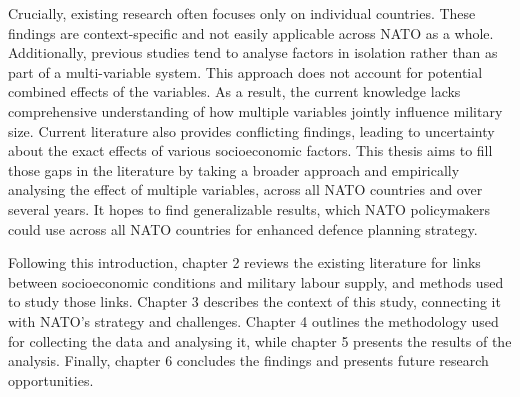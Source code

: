 Crucially, existing research 
often focuses only on individual countries. These findings are context-specific and not easily 
applicable across NATO as a whole. Additionally, previous studies tend to analyse factors in isolation 
rather than as part of a multi-variable system. This approach does not account for potential combined 
effects of the variables. As a result, the current knowledge lacks comprehensive understanding of 
how multiple variables jointly influence military size. Current literature also provides conflicting 
findings, leading to uncertainty about the exact effects of various socioeconomic factors. 
This thesis aims to fill those gaps in the literature by taking a 
broader approach and empirically analysing the effect of multiple variables, 
across all NATO countries and over several years.
It hopes to find generalizable results, which NATO policymakers could use across all NATO countries
for enhanced defence planning strategy.

Following this introduction, chapter 2 reviews the existing literature for links between socioeconomic 
conditions and military labour supply, and methods used to study those links. Chapter 3 describes the 
context of this study, connecting it with NATO's strategy and challenges. Chapter 4 outlines the methodology
used for collecting the data and analysing it, while chapter 5 presents the results of the analysis.
Finally, chapter 6 concludes the findings and presents future research opportunities.